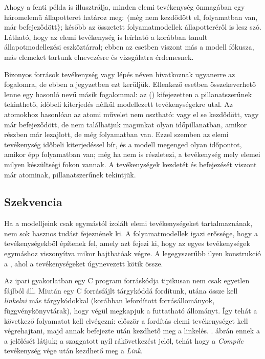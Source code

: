 
Ahogy a fenti példa is illusztrálja, minden elemi tevékenység önmagában egy háromelemű állapotteret határoz meg: $\{$még nem kezdődött el, folyamatban van, már befejeződött$\}$; később az összetett folyamatmodellek állapotteréről is lesz szó. Látható, hogy az elemi tevékenység is leírható a korábban tanult állapotmodellezési eszköztárral; ebben az esetben viszont más a modell fókusza, más elemeket tartunk elnevezésre és vizsgálatra érdemesnek.

\begin{megjegyzes}
	Bizonyos források  tevékenység vagy lépés néven hivatkoznak ugyanerre az  fogalomra, de ebben a jegyzetben ezt kerüljük. Ellenkező esetben összekeverhető lenne  egy hasonló nevű másik fogalommal: az  () kifejezetten a pillanatszerűnek tekinthető, időbeli kiterjedés nélkül modellezett tevékenységekre utal. Az atomokhoz hasonlóan az atomi művelet nem osztható: vagy el se kezdődött, vagy már befejeződött, de nem találhatjuk magunkat olyan időpillanatban, amikor részben már lezajlott, de még folyamatban van. Ezzel szemben az elemi tevékenység időbeli kiterjedéssel bír, és a modell megenged olyan időpontot, amikor épp folyamatban van; még ha nem is részletezi, a tevékenység mely elemei milyen készültségi fokon vannak. A tevékenységek kezdetét és befejezését viszont már atominak, pillanatszerűnek tekintjük.
\end{megjegyzes}

\subsection{Szekvencia}
Ha a modelljeink csak egymástól izolált elemi tevékenységeket tartalmaznának, nem sok hasznos tudást fejeznének ki. A folyamatmodellek igazi erőssége, hogy a tevékenységekből  építenek fel, amely azt fejezi ki, hogy az egyes tevékenységek egymáshoz viszonyítva mikor hajthatóak végre. A legegyszerűbb ilyen konstrukció a , ahol a tevékenységeket úgynevezett  kötik össze.

\begin{pelda}
Az ipari gyakorlatban egy C program forráskódja tipikusan nem csak egyetlen fájlból áll. Miután egy C forrásfájlt tárgykóddá fordítunk, utána össze kell \emph{linkelni} más tárgykódokkal (korábban lefordított forrásállományok, függvénykönyvtárak), hogy végül megkapjuk a futtatható állományt. Így tehát a következő folyamatot kell elvégezni: először a fordítás elemi tevékenységet kell végrehajtani, majd annak befejezte után kezdhető meg a linkelés. . ábrán ennek a  a jelölését látjuk; a szaggatott nyíl rákövetkezést jelöl, tehát hogy a \emph{Compile} tevékenység vége után kezdhető meg a \emph{Link}.
\end{pelda}

